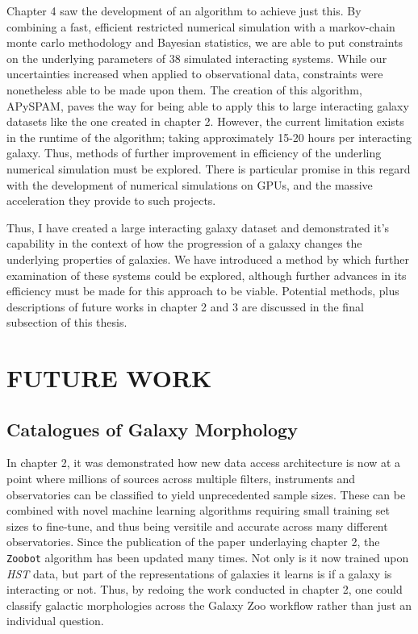 Chapter 4 saw the development of an algorithm to achieve just this. By combining a fast, efficient restricted numerical simulation with a markov-chain monte carlo methodology and Bayesian statistics, we are able to put constraints on the underlying parameters of 38 simulated interacting systems. While our uncertainties increased when applied to observational data, constraints were nonetheless able to be made upon them. The creation of this algorithm, APySPAM, paves the way for being able to apply this to large interacting galaxy datasets like the one created in chapter 2. However, the current limitation exists in the runtime of the algorithm; taking approximately 15-20 hours per interacting galaxy. Thus, methods of further improvement in efficiency of the underling numerical simulation must be explored. There is particular promise in this regard with the development of numerical simulations on GPUs, and the massive acceleration they provide to such projects.

Thus, I have created a large interacting galaxy dataset and demonstrated it's capability in the context of how the progression of a galaxy changes the underlying properties of galaxies. We have introduced a method by which further examination of these systems could be explored, although further advances in its efficiency must be made for this approach to be viable. Potential methods, plus descriptions of future works in chapter 2 and 3 are discussed in the final subsection of this thesis.

\section{FUTURE WORK}
\subsection{Catalogues of Galaxy Morphology}
\noindent In chapter 2, it was demonstrated how new data access architecture is now at a point where millions of sources across multiple filters, instruments and observatories can be classified to yield unprecedented sample sizes. These can be combined with novel machine learning algorithms requiring small training set sizes to fine-tune, and thus being versitile and accurate across many different observatories. Since the publication of the paper underlaying chapter 2, the \texttt{Zoobot} algorithm has been updated many times. Not only is it now trained upon \textit{HST} data, but part of the representations of galaxies it learns is if a galaxy is interacting or not. Thus, by redoing the work conducted in chapter 2, one could classify galactic morphologies across the Galaxy Zoo workflow rather than just an individual question.

